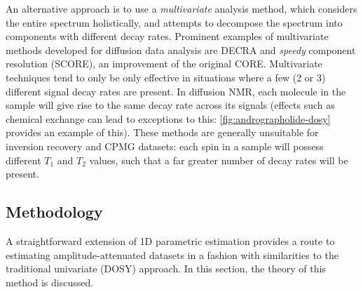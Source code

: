 An alternative approach
is to use a \emph{multivariate} analysis method, which considers the entire
spectrum holistically, and attempts to decompose the spectrum into components
with different decay rates. Prominent examples of multivariate methods
developed for diffusion data analysis are \ac{DECRA}\cite{Windig1998} and
\emph{speedy} component resolution (\acs{SCORE})\cite{Nilsson2008}, an
improvement of the original \acs{CORE}\cite{Stilbs1996,Stilbs1996b}.
Multivariate techniques tend to only be only effective in situations where a
few (2 or 3) different signal decay rates are present. In diffusion
\ac{NMR}, each molecule in the sample will give rise to the same decay rate
across its signals (effects such as chemical exchange can lead to exceptions to
this: \cref{fig:andrographolide-dosy} provides an example of this).
These methods are generally unsuitable for inversion recovery and \ac{CPMG} datasets:
each spin in a sample will possess different $T_1$ and $T_2$ values, such that
a far greater number of decay rates will be present.

\subsection{Methodology}
A straightforward extension of \ac{1D} parametric estimation
provides a route to estimating amplitude-attenuated datasets in a
fashion with similarities to the traditional univariate (\ac{DOSY}) approach.
In this section, the theory of this method is discussed.

